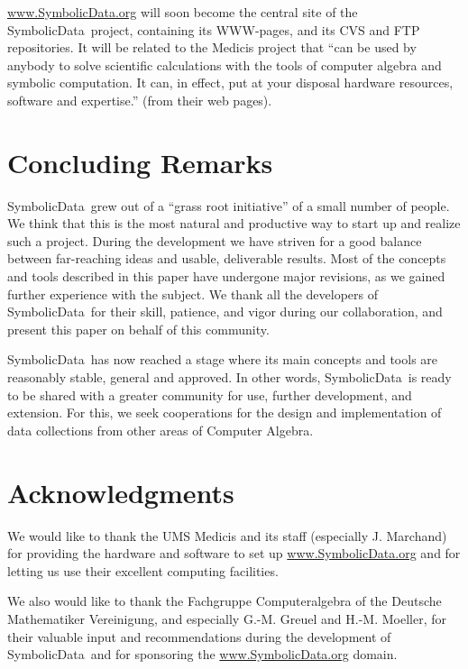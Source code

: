 \documentclass[11pt,a4paper]{article}
\newcommand{\SD}{{\sc Symbolic\-Data}}
\begin{document}
\url{www.SymbolicData.org} will soon become the central site of the \SD\
project, containing its WWW-pages, and its CVS and FTP repositories.
It will be related to the {\sc Medicis} project \cite{Medicis} that
``can be used by anybody to solve scientific calculations with the
tools of computer algebra and symbolic computation. It can, in effect,
put at your disposal hardware resources, software and expertise.''
(from their web pages). 


\section{Concluding Remarks}

\SD\ grew out of a ``grass root initiative'' of
a small number of people.  We think that this is the most natural and
productive way to start up and realize such a project.  During the
development we have striven for a good balance 
between far-reaching ideas and usable, deliverable results.  Most of
the concepts and tools described in this paper have undergone major
revisions, as we gained further experience with the subject.  We thank
all the developers of \SD\ for their skill, patience, and vigor
during our collaboration, and present this paper on behalf of this
community.

\SD\ has now reached a stage where its main concepts and tools are
reasonably stable, 
general and approved. In other words, \SD\ is ready to be shared with a
greater community for use, further development, and extension. For
this, we seek cooperations for the design and implementation of data
collections from other areas of Computer Algebra.

\section*{Acknowledgments}

We would like to thank the UMS Medicis and its staff (especially J.
Marchand) for providing the hardware and software to set up
\url{www.SymbolicData.org} and for letting us use their excellent
computing facilities.

We also would like to thank the Fachgruppe Computeralgebra of the
Deutsche Mathematiker Vereinigung, and especially G.-M. Greuel and
H.-M. Moeller, for their valuable input and recommendations during the
development of \SD\ and for sponsoring the \url{www.SymbolicData.org}
domain.
\end{document}
